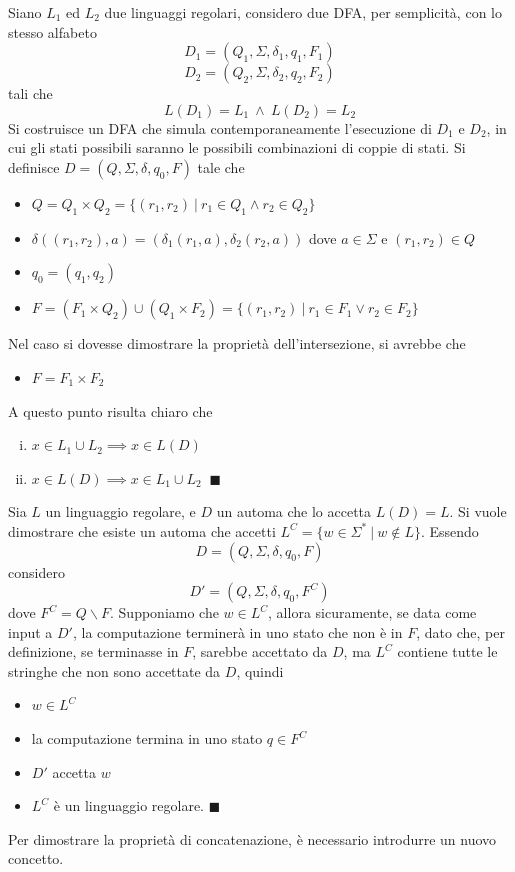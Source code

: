 \documentclass[10pt, letterpaper]{report}
\begin{document}
 Siano $L_1$ ed $L_2$ due linguaggi regolari, considero due DFA, per semplicità, con lo stesso alfabeto
$$ 
D_1 = (Q_1,\Sigma,\delta_1,q_1,F_1)
$$
$$ 
D_2 = (Q_2,\Sigma,\delta_2,q_2,F_2)
$$
tali che 
$$ L(D_1)=L_1 \ \land \ L(D_2)=L_2$$
Si costruisce un DFA che simula contemporaneamente l'esecuzione di $D_1$ e $D_2$, in cui gli stati possibili saranno 
le possibili combinazioni di coppie di stati. Si definisce $D=(Q,\Sigma,\delta,q_0,F)$ tale che 
\begin{itemize}
    \item $Q=Q_1\times Q_2=\{(r_1,r_2) \ | \ r_1\in Q_1 \land r_2\in Q_2\}$
    \item $\delta((r_1,r_2),a)=(\delta_1(r_1,a),\delta_2(r_2,a))$ dove $a\in\Sigma$ e $(r_1,r_2)\in Q$
    \item $q_0=(q_1,q_2)$
    \item $F=(F_1\times Q_2)\cup (Q_1\times F_2)=\{(r_1,r_2)\ | \ r_1\in F_1\lor r_2\in F_2\}$
\end{itemize}
Nel caso si dovesse dimostrare la proprietà dell'intersezione, si avrebbe che \begin{itemize}
    \item $F=F_1\times F_2$
\end{itemize}
A questo punto risulta chiaro che 
\begin{enumerate}[(i)] 
    \item $x\in L_1\cup L_2\implies x\in L(D)$
    \item $x\in L(D)\implies x\in L_1\cup L_2\;\;\blacksquare$ 
\end{enumerate}
  Sia $L$ un linguaggio regolare, e $D$ un automa che lo accetta $L(D)=L$. Si vuole dimostrare 
che esiste un automa che accetti $L^C = \{w\in \Sigma^* \ |\ w\notin L\}$. Essendo 
$$ D=(Q,\Sigma,\delta,q_0,F)$$
considero 
$$ D'=(Q,\Sigma,\delta,q_0,F^C)$$
dove  $F^C=Q\backslash F$. Supponiamo che $w\in L^C$, allora sicuramente, se data come input a $D'$, 
la computazione terminerà in uno stato che non è in $F$, dato che, per definizione, se terminasse in $F$, sarebbe 
accettato da $D$, ma $L^C$ contiene tutte le stringhe che non sono accettate da $D$, quindi\begin{itemize}
    \item $w\in L^C$
    \item  la computazione termina in uno stato $q\in F^C$ 
    \item $D'$ accetta $w$ 
    \item $L^C$ è un linguaggio regolare. $\blacksquare$ 
\end{itemize} 
Per dimostrare la proprietà di concatenazione, è necessario introdurre un nuovo concetto. 
\flowerLine 
\end{document}
